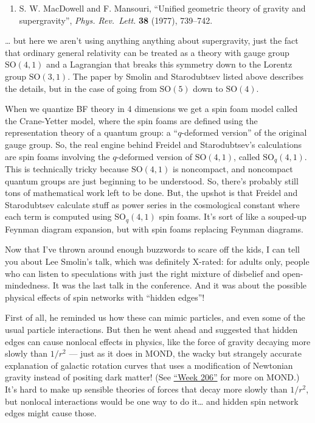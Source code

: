 \documentclass{article}
\def\tightlist{}
\begin{document}
\begin{enumerate}
\def\labelenumi{\arabic{enumi})}
\setcounter{enumi}{7}
\tightlist
\item
  S. W. MacDowell and F. Mansouri, ``Unified geometric theory of gravity
  and supergravity'', \emph{Phys. Rev.~Lett.} \textbf{38} (1977),
  739--742.
\end{enumerate}

\ldots{} but here we aren't using anything anything about supergravity,
just the fact that ordinary general relativity can be treated as a
theory with gauge group \(\mathrm{SO}(4,1)\) and a Lagrangian that
breaks this symmetry down to the Lorentz group \(\mathrm{SO}(3,1)\). The
paper by Smolin and Starodubtsev listed above describes the details, but
in the case of going from \(\mathrm{SO}(5)\) down to \(\mathrm{SO}(4)\).

When we quantize BF theory in 4 dimensions we get a spin foam model
called the Crane-Yetter model, where the spin foams are defined using
the representation theory of a quantum group: a ``\(q\)-deformed
version'' of the original gauge group. So, the real engine behind
Freidel and Starodubtsev's calculations are spin foams involving the
\(q\)-deformed version of \(\mathrm{SO}(4,1)\), called
\(\mathrm{SO}_q(4,1)\). This is technically tricky because
\(\mathrm{SO}(4,1)\) is noncompact, and noncompact quantum groups are
just beginning to be understood. So, there's probably still tons of
mathematical work left to be done. But, the upshot is that Freidel and
Starodubtsev calculate stuff as power series in the cosmological
constant where each term is computed using \(\mathrm{SO}_q(4,1)\) spin
foams. It's sort of like a souped-up Feynman diagram expansion, but with
spin foams replacing Feynman diagrams.

Now that I've thrown around enough buzzwords to scare off the kids, I
can tell you about Lee Smolin's talk, which was definitely X-rated: for
adults only, people who can listen to speculations with just the right
mixture of disbelief and open-mindedness. It was the last talk in the
conference. And it was about the possible physical effects of spin
networks with ``hidden edges''!

First of all, he reminded us how these can mimic particles, and even
some of the usual particle interactions. But then he went ahead and
suggested that hidden edges can cause nonlocal effects in physics, like
the force of gravity decaying more slowly than \(1/r^2\) --- just as it
does in MOND, the wacky but strangely accurate explanation of galactic
rotation curves that uses a modification of Newtonian gravity instead of
positing dark matter! (See \protect\hyperlink{week206}{``Week 206''} for
more on MOND.) It's hard to make up sensible theories of forces that
decay more slowly than \(1/r^2\), but nonlocal interactions would be one
way to do it\ldots{} and hidden spin network edges might cause those.
\end{document}

